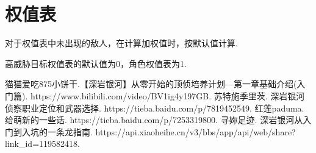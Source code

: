 \documentclass{ctexart}
\begin{document}
\section{权值表}

对于权值表中未出现的敌人，在计算加权值时，按默认值计算.

高威胁目标权值表的默认值为0，角色权值表为1.




\begin{thebibliography}{99}
     猫猫爱吃875小饼干.【深岩银河】从零开始的顶侦培养计划---第一章基础介绍(入门篇). https://www.bilibili.com/video/BV1ig4y197GB.
     苏特施季里茨. 深岩银河侦察职业定位和武器选择. https://tieba.baidu.com/p/7819452549.
     红莲paduma. 给萌新的一些话. https://tieba.baidu.com/p/7253319800.
     寻妳足迹. 深岩银河从入门到入坑的一条龙指南. https://api.xiaoheihe.cn/v3/bbs/app/api/web/share?link\_id=119582418.
\end{thebibliography}
\end{document}
